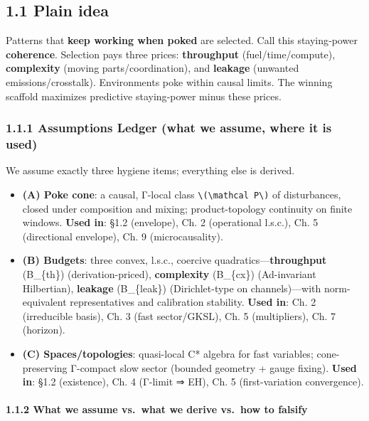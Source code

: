 \documentclass[
]{article}
\providecommand{\tightlist}{%
  \setlength{\itemsep}{0pt}\setlength{\parskip}{0pt}}
\numberwithin{equation}{section}
\begin{document}
\hypertarget{plain-idea}{%
\subsection{1.1 Plain idea}\label{plain-idea}}

Patterns that \textbf{keep working when poked} are selected. Call this
staying‑power \textbf{coherence}. Selection pays three prices:
\textbf{throughput} (fuel/time/compute), \textbf{complexity} (moving
parts/coordination), and \textbf{leakage} (unwanted
emissions/crosstalk). Environments poke within causal limits. The
winning scaffold maximizes predictive staying‑power minus these prices.

\hypertarget{assumptions-ledger-what-we-assume-where-it-is-used}{%
\subsubsection{1.1.1 Assumptions Ledger (what we assume, where it is
used)}\label{assumptions-ledger-what-we-assume-where-it-is-used}}

We assume exactly three hygiene items; everything else is derived.

\begin{itemize}
\tightlist
\item
  \textbf{(A) Poke cone}: a causal, Γ-local class
  \texttt{\textbackslash{}(\textbackslash{}mathcal\ P\textbackslash{})}
  of disturbances, closed under composition and mixing; product-topology
  continuity on finite windows. \textbf{Used in}: §1.2 (envelope), Ch. 2
  (operational l.s.c.), Ch. 5 (directional envelope), Ch. 9
  (microcausality).
\item
  \textbf{(B) Budgets}: three convex, l.s.c., coercive
  quadratics---\textbf{throughput} (B\_\{\rm th\}) (derivation-priced),
  \textbf{complexity} (B\_\{\rm cx\}) (Ad-invariant Hilbertian),
  \textbf{leakage} (B\_\{\rm leak\}) (Dirichlet-type on channels)---with
  norm-equivalent representatives and calibration stability.
  \textbf{Used in}: Ch. 2 (irreducible basis), Ch. 3 (fast sector/GKSL),
  Ch. 5 (multipliers), Ch. 7 (horizon).
\item
  \textbf{(C) Spaces/topologies}: quasi-local C* algebra for fast
  variables; cone-preserving Γ-compact slow sector (bounded geometry +
  gauge fixing). \textbf{Used in}: §1.2 (existence), Ch. 4 (Γ-limit ⇒
  EH), Ch. 5 (first-variation convergence).
\end{itemize}

\hypertarget{what-we-assume-vs.-what-we-derive-vs.-how-to-falsify}{%
\paragraph{1.1.2 What we assume vs.~what we derive vs.~how to
falsify}\label{what-we-assume-vs.-what-we-derive-vs.-how-to-falsify}}
\end{document}
